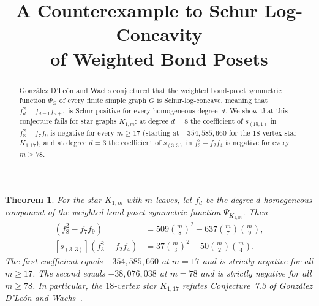 \documentclass[11pt,letterpaper]{article}
\title{A Counterexample to Schur Log-Concavity\\of Weighted Bond Posets}
\author{}
\date{}
\newtheorem{theorem}{Theorem}
\newcommand{\coef}[2]{[#1]\!\left(#2\right)}
\begin{document}
\maketitle
\vspace{-2.5em}

\begin{abstract}
Gonz\'alez D'Le\'on and Wachs conjectured that the weighted bond-poset symmetric function $\Psi_G$ of every finite simple graph $G$ is Schur-log-concave, meaning that $f_d^2 - f_{d-1}f_{d+1}$ is Schur-positive for every homogeneous degree~$d$. We show that this conjecture fails for star graphs $K_{1,m}$: at degree $d=8$ the coefficient of $s_{(15,1)}$ in $f_8^2-f_7f_9$ is negative for every $m \geq 17$ (starting at $-354{,}585{,}660$ for the $18$-vertex star $K_{1,17}$), and at degree $d=3$ the coefficient of $s_{(3,3)}$ in $f_3^2-f_2f_4$ is negative for every $m \geq 78$.
\end{abstract}

\begin{theorem}
For the star $K_{1,m}$ with $m$ leaves, let $f_d$ be the degree-$d$ homogeneous component of the weighted bond-poset symmetric function $\Psi_{K_{1,m}}$. Then
\begin{align*}
\coef{s_{(15,1)}}{f_8^2-f_7f_9}&=509\binom{m}{8}^{\!2}-637\binom{m}{7}\binom{m}{9},\\
\coef{s_{(3,3)}}{f_3^2-f_2f_4}&=37\binom{m}{3}^{\!2}-50\binom{m}{2}\binom{m}{4}.
\end{align*}
The first coefficient equals $-354{,}585{,}660$ at $m=17$ and is strictly negative for all $m\geq 17$. The second equals $-38{,}076{,}038$ at $m=78$ and is strictly negative for all $m\geq 78$. In particular, the $18$-vertex star $K_{1,17}$ refutes Conjecture~7.3 of Gonz\'alez D'Le\'on and Wachs~\cite{bond}.
\end{theorem}
\end{document}
